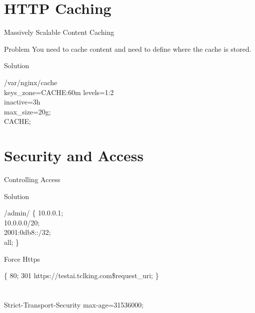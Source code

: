 \documentclass{beamer}
\begin{document}
\section{HTTP Caching}
\begin{frame}{Massively Scalable Content Caching}
	\begin{minipage}[t]{0.8\textwidth}
	\begin{block}{Problem}
		\vspace{0.02\textheight}
		You need to cache content and need to define where the cache is stored.
	\end{block}
	
	\begin{block}{Solution}
		\vspace{0.02\textheight}
		\scriptsize
		\begin{Alms*}
			
			 	/var/nginx/cache \NI
			\\
			keys\_zone=CACHE:60m
			levels=1:2 \\
			inactive=3h \\
			max\_size=20g;
			\\
			\ND {} CACHE;
			
		\end{Alms*}
	\end{block}
\end{minipage}
\end{frame}


\section{Security and Access}
\begin{frame}{Controlling Access}
	\begin{block}{Solution}
	\vspace{0.02\textheight}
	\scriptsize
	\begin{Alms*}
		 /admin/ \{ \NI
			 10.0.0.1; \\
			 10.0.0.0/20; \\
			 2001:0db8::/32; \\
			\K{deny} all;
		\ND \}
	\end{Alms*}
\end{block}
\end{frame}


\begin{frame}{Force Https}
	\vspace{0.02\textheight}
	\scriptsize
	\begin{Alms*}
		  \{ \NI
			\K{listen} 80;
			 301 https://testai.tclking.com\$request\_uri;
		\ND \}
		\\
		\\
		\\
		 Strict-Transport-Security max-age=31536000;
	\end{Alms*}
\end{frame}
\end{document}
